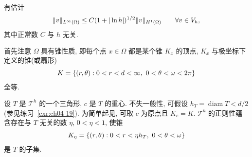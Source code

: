 \setcounter{thmcount}{1}
\begin{Lemma}
\label{lem:ch04-discrete-sobolev-inequality}
有估计
\begin{equation}
\MathBookFormulaID{formula-ch04-discrete-sobolev-inequality}
\label{eq:ch04-discrete-sobolev-inequality}
\|v\|_{L^\infty(\Omega)}
\leq C(1+|\ln h|)^{1/2}\|v\|_{H^1(\Omega)}
\qquad\forall v\in V_h,
\end{equation}
其中正常数 $C$ 与 $h$ 无关.
\end{Lemma}
\begin{Proof}
首先注意 $\Omega$ 具有锥性质, 即每个点 $x\in\Omega$ 都是某个锥 $K_x$ 的顶点, $K_x$ 与极坐标下定义的锥(或扇形)
\[
\MathBookFormulaID{formula-ch04-reference-cone}
K=\{(r,\theta):0<r<d<\infty,\ 0<\theta<\omega<2\pi\}
\]
全等.

设 $T$ 是 $\mathcal T^h$ 的一个三角形, $c$ 是 $T$ 的重心. 不失一般性, 可假设 $h_T=\operatorname{diam}T<d/2$(参见练习~\ref{exr:ch04-19}). 为简单起见, 可取 $c$ 为原点且 $K_c=K$. $\mathcal T^h$ 的正则性蕴含存在与 $T$ 无关的数 $\eta$, $0<\eta<1$, 使锥
\[
\MathBookFormulaID{formula-ch04-inner-element-cone}
K_\eta=\{(r,\theta):0<r<\eta h_T,\ 0<\theta<\omega\}
\]
是 $T$ 的子集.


\end{Proof}

